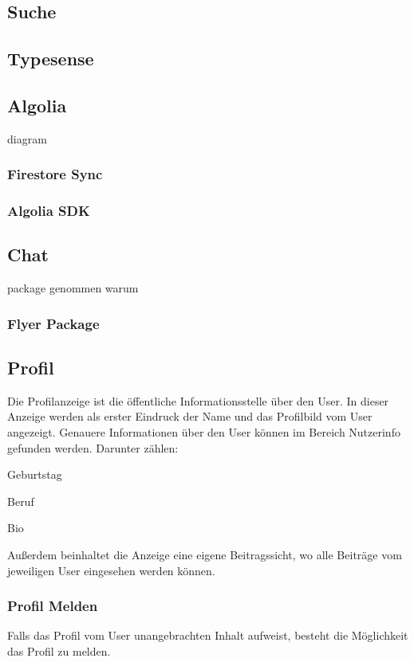 \subsection{Suche}
\subsection{Typesense}
\subsection{Algolia}
diagram
\subsubsection{Firestore Sync}

\subsubsection{Algolia SDK}


\subsection{Chat}
package genommen warum
\subsubsection{Flyer Package}

\subsection{Profil}
Die Profilanzeige ist die öffentliche Informationsstelle über den User. In dieser Anzeige werden als erster Eindruck der Name und das Profilbild vom User angezeigt. Genauere Informationen über den User können im Bereich Nutzerinfo gefunden werden. Darunter zählen:
\begin{compactitem}
  \item Geburtstag
  \item Beruf
  \item Bio
\end{compactitem}
Außerdem beinhaltet die Anzeige eine eigene Beitragssicht, wo alle Beiträge vom jeweiligen User eingesehen werden können.

\subsubsection{Profil Melden}
Falls das Profil vom User unangebrachten Inhalt aufweist, besteht die Möglichkeit das Profil zu melden.

